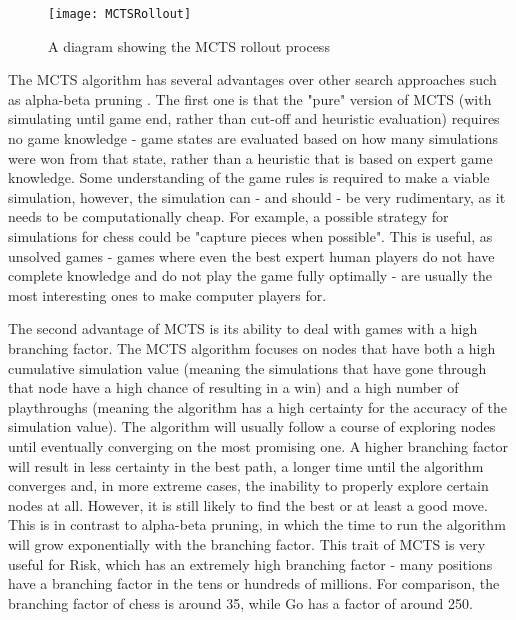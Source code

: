 \begin{figure}[H]
\texttt{[image: MCTSRollout]}
\caption{A diagram showing the MCTS rollout process}
\label{fig:MCTSRollout}
\end{figure}

The MCTS algorithm has several advantages over other search approaches such as alpha-beta pruning \cite{knuth1975analysis}. The first one is that the "pure" version of MCTS (with simulating until game end, rather than cut-off and heuristic evaluation) requires no game knowledge - game states are evaluated based on how many simulations were won from that state, rather than a heuristic that is based on expert game knowledge. Some understanding of the game rules is required to make a viable simulation, however, the simulation can - and should - be very rudimentary, as it needs to be computationally cheap. For example, a possible strategy for simulations for chess could be "capture pieces when possible". This is useful, as unsolved games - games where even the best expert human players do not have complete knowledge and do not play the game fully optimally - are usually the most interesting ones to make computer players for.

The second advantage of MCTS is its ability to deal with games with a high branching factor. The MCTS algorithm focuses on nodes that have both a high cumulative simulation value (meaning the simulations that have gone through that node have a high chance of resulting in a win) and a high number of playthroughs (meaning the algorithm has a high certainty for the accuracy of the simulation value). The algorithm will usually follow a course of exploring nodes until eventually converging on the most promising one. A higher branching factor will result in less certainty in the best path, a longer time until the algorithm converges and, in more extreme cases, the inability to properly explore certain nodes at all. However, it is still likely to find the best or at least a good move. This is in contrast to alpha-beta pruning, in which the time to run the algorithm will grow exponentially with the branching factor. This trait of MCTS is very useful for Risk, which has an extremely high branching factor \cite{bauer2023artificial} - many positions have a branching factor in the tens or hundreds of millions. For comparison, the branching factor of chess is around 35, while Go has a factor of around 250.

